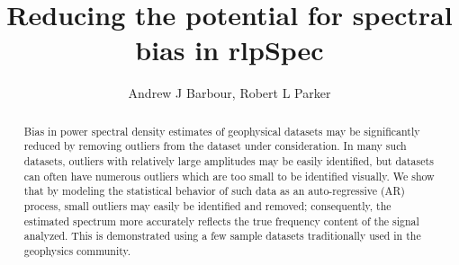 \documentclass[preprint,authoryear,12pt]{elsarticle}
\begin{document}
\begin{frontmatter}
\title{Reducing the potential for spectral bias in 
rlpSpec}
\author{Andrew J Barbour, Robert L Parker}
\address{}
\begin{abstract}
Bias in power spectral density estimates 
of geophysical datasets 
may be significantly reduced by removing
outliers from the dataset under consideration.  
In many such datasets,
outliers with relatively large amplitudes
may be easily identified, but datasets can often have
numerous outliers which are too small to be identified visually.
We show that by modeling the statistical behavior of such
data as an auto-regressive (AR)
process, small outliers may easily be identified and removed; 
consequently, the estimated spectrum more accurately reflects
the true frequency content of the signal analyzed.
This is demonstrated using a few sample datasets traditionally used in the
geophysics community.
\end{abstract}
\begin{keyword}
\end{keyword}
\end{frontmatter}

\end{document}
